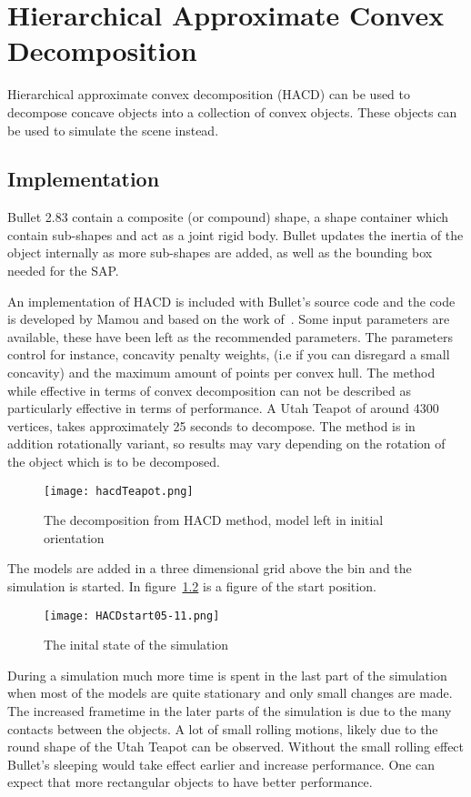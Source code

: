 \chapter{Hierarchical Approximate Convex Decomposition}\label{sec:hacd}
Hierarchical approximate convex decomposition (HACD) can be used to decompose
concave objects into a collection of convex objects. These objects can be used
to simulate the scene instead.
\section{Implementation}
Bullet 2.83 contain a
composite (or compound) shape, a shape container which contain sub-shapes and act
as a joint rigid body. Bullet updates the inertia of the object internally as
more sub-shapes are added, as well as the bounding box needed for the SAP.

An implementation of HACD is included with Bullet's source code and the code is
developed by Mamou and based on the work of~\cite{mamou}. Some input parameters are available, these have been
left as the recommended parameters. The parameters control for instance, concavity
penalty weights, (i.e if you can disregard a small concavity)
and the maximum amount of points per convex hull.
The method while effective in terms of convex decomposition can not be described as
particularly effective in terms of performance. A Utah Teapot of around 4300 vertices,
takes approximately 25 seconds to decompose. The method is in addition rotationally
 variant, so results may vary depending on the rotation of the object which is to be decomposed.

 \begin{figure}[H]
   \centering
   \texttt{[image: hacdTeapot.png]}
   \caption{The decomposition from HACD method, model left in initial orientation}
   \label{fig:HACD}
 \end{figure}

The models are added in a three dimensional grid above the bin and the simulation
is started. In figure~\ref{fig:hacdStart} is a figure of the start position.

\begin{figure}[H]
  \centering
  \texttt{[image: HACDstart05-11.png]}
  \caption{The inital state of the simulation}
  \label{fig:hacdStart}
\end{figure}

During a simulation much more time is spent in the last
part of the simulation when most of the models are quite stationary and only small
changes are made. The increased frametime in the later parts of the simulation is
due to the many contacts between the objects. A lot of small rolling motions, likely due to the round
shape of the Utah Teapot can be observed. Without the small rolling effect Bullet's
sleeping would take effect earlier and increase performance. One can expect that
more rectangular objects to have better performance.

